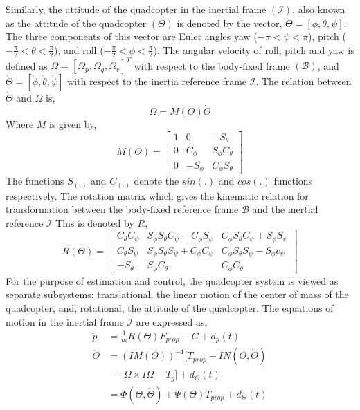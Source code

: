 \documentclass[letterpaper%
, twoside%
, 12pt%
,memoire%
, english%
,creativecommons,hyperref%
]{thETS}
\begin{document}
Similarly, the attitude of the quadcopter in the inertial frame $(\mathcal{I})$, also known as the attitude of the quadcopter $(\Theta)$ is denoted by the vector, $\Theta=[\phi,\theta,\psi]$. The three components of this vector are Euler angles yaw ($-\pi<\psi<\pi$), pitch ($-\frac{\pi}{2}<\theta<\frac{\pi}{2}$), and roll ($-\frac{\pi}{2}<\phi<\frac{\pi}{2}$). The angular velocity of roll, pitch and yaw is defined as $\Omega=[\Omega_p,\Omega_q,\Omega_r]^T$ with respect to the body-fixed frame $(\mathcal{B})$, and $\dot{\Theta}=[\dot{\phi},\dot{\theta},\dot{\psi}]$ with respect to the inertia reference frame $\mathcal{I}$. The relation between $\dot{\Theta}$ and $\Omega$ is, 
\begin{equation}
\Omega=M(\Theta)\dot{\Theta}
\end{equation}
Where $M$ is given by, 
\begin{equation*}
M(\Theta)=
\left[\begin{array}{ccc}
1 & 0 & -S_{\theta} \\
0 & C_{\phi} & S_{\phi}C_{\theta}  \\
0 & -S_{\phi} & C_{\phi}S_{\theta}
\end{array}\right]
\end{equation*}
The functions $S_{(.)}$ and $C_{(.)}$ denote the $sin(.)$ and $cos(.)$ functions respectively. The rotation matrix which gives the kinematic relation for transformation between the body-fixed reference frame $\mathcal{B}$ and the inertial reference $\mathcal{I}$ This is denoted by $R$,
\begin{equation}
R(\Theta)=
\left[\begin{array}{ccc}
C_{\theta}C_{\psi} & S_{\phi}S_{\theta}C_{\psi}-C_{\phi}S_{\psi} & C_{\phi}S_{\theta}C_{\psi}+S_{\phi}S_{\psi} \\
C_{\theta}S_{\psi} & S_{\phi}S_{\theta}S_{\psi}+C_{\phi}C_{\psi} & C_{\phi}S_{\theta}S_{\psi}-S_{\phi}c_{\psi}  \\
-S_{\theta}  & S_{\phi}C_{\theta}  & C_{\phi}C_{\theta}
\end{array}\right]
\end{equation} 
For the purpose of estimation and control, the quadcopter system is viewed as separate subsystems: translational, the linear motion of the center of mass of the quadcopter, and, rotational, the attitude of the quadcopter. The equations of motion in the inertial frame $\mathcal{I}$ are expressed as,
\begin{subequations} \label{eq:dynamic_basic}
\begin{align} 
\ddot{p} &=\frac{1}{m}R(\Theta)F_{prop}-G+d_{p}(t) \label{eq:dynamic_basic_translation} \\
\ddot{\Theta} &=(IM(\Theta))^{-1}[T_{prop}-IN(\Theta,\dot{\Theta}) \nonumber \\
& \ \ -\Omega\times I\Omega-T_g]+d_{\Theta}(t)\nonumber\\
&=\Phi(\Theta,\dot{\Theta})+\Psi(\Theta) T_{prop}+d_{\Theta}(t)
 \label{eq:dynamic_basic_rotation}
\end{align}
\end{subequations}
\end{document}
